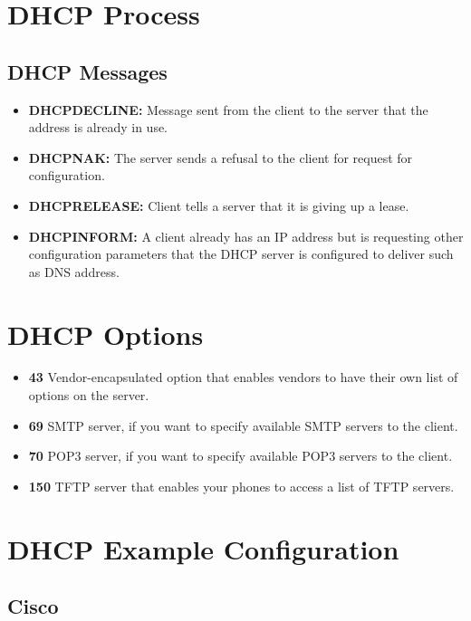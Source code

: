 \section{DHCP Process}


\subsection{DHCP Messages}

\begin{itemize}
    \item \textbf{DHCPDECLINE:} Message sent from the client to the server that the address is already in use.
    \item \textbf{DHCPNAK:} The server sends a refusal to the client for request for configuration.
    \item \textbf{DHCPRELEASE:} Client tells a server that it is giving up a lease.
    \item \textbf{DHCPINFORM:} A client already has an IP address but is requesting other configuration parameters that the DHCP server is configured to deliver such as DNS address.
\end{itemize}

\section{DHCP Options}

\begin{itemize}
    \item \textbf{43} Vendor-encapsulated option that enables vendors to have their own list of options on the server.
    \item \textbf{69} SMTP server, if you want to specify available SMTP servers to the client.
    \item \textbf{70} POP3 server, if you want to specify available POP3 servers to the client.
    \item \textbf{150} TFTP server that enables your phones to access a list of TFTP servers.
\end{itemize}

\section{DHCP Example Configuration}

\subsection{Cisco}

